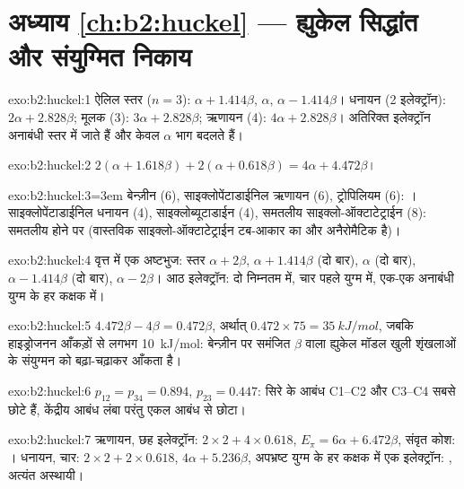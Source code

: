 \section*{अध्याय \ref{ch:b2:huckel} --- ह्युकेल सिद्धांत और संयुग्मित निकाय}

\begin{solution}{exo:b2:huckel:1}
ऐलिल स्तर ($n = 3$): $\alpha + 1.414\beta$, $\alpha$, $\alpha - 1.414\beta$। धनायन (2 इलेक्ट्रॉन):
$2\alpha + 2.828\beta$; मूलक (3): $3\alpha + 2.828\beta$; ऋणायन (4): $4\alpha + 2.828\beta$। अतिरिक्त
इलेक्ट्रॉन अनाबंधी स्तर में जाते हैं और केवल $\alpha$ भाग बदलते हैं।
\end{solution}

\begin{solution}{exo:b2:huckel:2}
$2(\alpha + 1.618\beta) + 2(\alpha + 0.618\beta) = 4\alpha + 4.472\beta$।
\end{solution}

\begin{solution}{exo:b2:huckel:3}\emergencystretch=3em
बेन्ज़ीन (6), साइक्लोपेंटाडाईनिल ऋणायन (6), ट्रोपिलियम (6): । साइक्लोपेंटाडाईनिल
धनायन (4), साइक्लोब्यूटाडाईन (4), समतलीय साइक्लो-ऑक्टाटेट्राईन (8): समतलीय होने पर 
(वास्तविक साइक्लो-ऑक्टाटेट्राईन टब-आकार का और अनैरोमैटिक है)।
\end{solution}

\begin{solution}{exo:b2:huckel:4}
वृत्त में एक अष्टभुज: स्तर $\alpha + 2\beta$, $\alpha + 1.414\beta$ (दो बार), $\alpha$ (दो बार),
$\alpha - 1.414\beta$ (दो बार), $\alpha - 2\beta$। आठ इलेक्ट्रॉन: दो निम्नतम में, चार
पहले युग्म में, एक-एक अनाबंधी युग्म के हर कक्षक में।
\end{solution}

\begin{solution}{exo:b2:huckel:5}
$4.472\beta - 4\beta = 0.472\beta$, अर्थात् $0.472 \times 75 = \qty{35}{kJ/mol}$, जबकि हाइड्रोजनन
आँकड़ों से लगभग \qty{10}{kJ/mol}: बेन्ज़ीन पर समंजित $\beta$ वाला ह्युकेल मॉडल
खुली शृंखलाओं के संयुग्मन को बढ़ा-चढ़ाकर आँकता है।
\end{solution}

\begin{solution}{exo:b2:huckel:6}
$p_{12} = p_{34} = 0.894$, $p_{23} = 0.447$: सिरे के आबंध C1--C2 और C3--C4
सबसे छोटे हैं, केंद्रीय आबंध लंबा परंतु एकल आबंध से छोटा।
\end{solution}

\begin{solution}{exo:b2:huckel:7}
ऋणायन, छह इलेक्ट्रॉन: $2 \times 2 + 4 \times 0.618$, $E_\pi = 6\alpha + 6.472\beta$, संवृत कोश:
। धनायन, चार: $2 \times 2 + 2 \times 0.618$, $4\alpha + 5.236\beta$, अपभ्रष्ट युग्म के
हर कक्षक में एक इलेक्ट्रॉन: , अत्यंत अस्थायी।
\end{solution}

